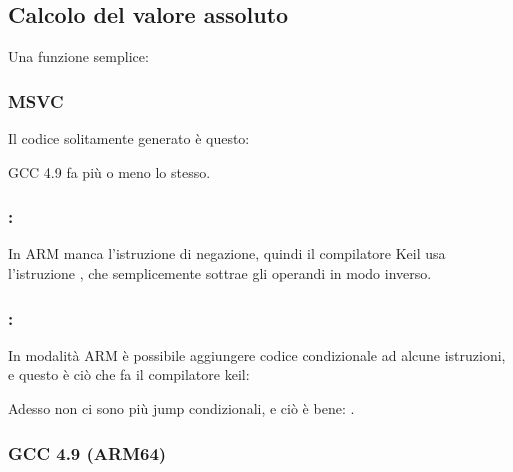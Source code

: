 \subsection{Calcolo del valore assoluto}
\label{sec:abs}

Una funzione semplice:



\subsubsection{\Optimizing MSVC}

Il codice solitamente generato è questo:



GCC 4.9 fa più o meno lo stesso.

\subsubsection{\OptimizingKeilVI: \ThumbMode}




In ARM manca l'istruzione di negazione, quindi il compilatore Keil usa l'istruzione , che semplicemente sottrae gli operandi in modo inverso.

\subsubsection{\OptimizingKeilVI: \ARMMode}

In modalità ARM è possibile aggiungere codice condizionale ad alcune istruzioni, e questo è ciò che fa il compilatore keil:



Adesso non ci sono più jump condizionali, e ciò è bene: .

\subsubsection{\NonOptimizing GCC 4.9 (ARM64)}



